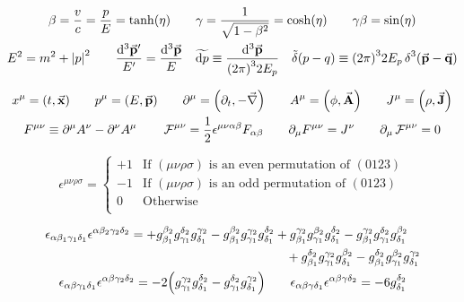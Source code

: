 \begin{gather*}
        \beta
        = \frac{v}{c}
        = \frac{p}{E}
        = \tanh(\eta)
        \qquad
        \gamma
        = \frac{1}{\sqrt{1-\beta^2}}
        = \cosh(\eta)
        \qquad
        \gamma\beta = \sin(\eta)
        \\
        E^2 = m^2 + \abs{p}^2
        \qquad
        \frac{\dd[3]{\va{p}'}}{E'} = \frac{\dd[3]{\va{p}}}{E}
        \quad
        \widetilde{\dd{p}} \equiv \frac{\dd[3]{\va{p}}}{\qty(2\pi)^32E_p}
        \quad
        \tilde{\delta}\qty(p-q) \equiv \qty(2\pi)^32E_p\Ddelta[3](\va{p}-\va{q})
\end{gather*}

\begin{gather*}
        x^{\mu} = (t, \va{x})
        \qquad
        p^{\mu} = (E, \va{p})
        \qquad
        \partial^{\mu} = \qty(\partial_t, -\va{\nabla})
        \qquad
        A^{\mu} = \qty(\phi, \va{A})
        \qquad
        J^{\mu} = \qty(\rho, \va{J})
        \\
        F^{\mu\nu} \equiv \partial^\mu A^\nu - \partial^\nu A^\mu
        \qquad
        \operatorname{\mathcal{F}}^{\mu\nu} = \frac{1}{2}\epsilon^{\mu\nu\alpha\beta}F_{\alpha\beta}
        \qquad
        \partial_\mu F^{\mu\nu} = J^{\nu}
        \qquad
        \partial_\mu \operatorname{\mathcal{F}}^{\mu\nu} = 0
\end{gather*}

\begin{equation*}
        \epsilon^{\mu\nu\rho\sigma} = \begin{cases}
                +1 &\text{If $(\mu\nu\rho\sigma)$ is an even permutation of $(0123)$} \\
                -1 &\text{If $(\mu\nu\rho\sigma)$ is an odd permutation of $(0123)$} \\
                0  &\text{Otherwise} \\
        \end{cases}
\end{equation*}

\begin{gather*}
    \begin{multlined}
        \epsilon_{\alpha\beta_1\gamma_1\delta_1}\epsilon^{\alpha\beta_2\gamma_2\delta_2}
        =
        + g^{\beta_2}_{\beta_1}g^{\delta_2}_{\gamma_1}g^{\gamma_2}_{\delta_1}
        - g^{\beta_2}_{\beta_1}g^{\gamma_2}_{\gamma_1}g^{\delta_2}_{\delta_1}
        + g^{\gamma_2}_{\beta_1}g^{\beta_2}_{\gamma_1}g^{\delta_2}_{\delta_1}
        - g^{\gamma_2}_{\beta_1}g^{\delta_2}_{\gamma_1}g^{\beta_2}_{\delta_1}
        \\
        + g^{\delta_2}_{\beta_1}g^{\gamma_2}_{\gamma_1}g^{\beta_2}_{\delta_1}
        - g^{\delta_2}_{\beta_1}g^{\beta_2}_{\gamma_1}g^{\gamma_2}_{\delta_1}
    \end{multlined}
    \\
    \epsilon_{\alpha\beta\gamma_1\delta_1}\epsilon^{\alpha\beta\gamma_2\delta_2} = -2\qty(g_{\gamma_1}^{\gamma_2}g_{\delta_1}^{\delta_2} - g_{\gamma_1}^{\delta_2}g_{\delta_1}^{\gamma_2})
    \qquad
    \epsilon_{\alpha\beta\gamma\delta_1}\epsilon^{\alpha\beta\gamma\delta_2} = -6g_{\delta_1}^{\delta_2}
\end{gather*}
